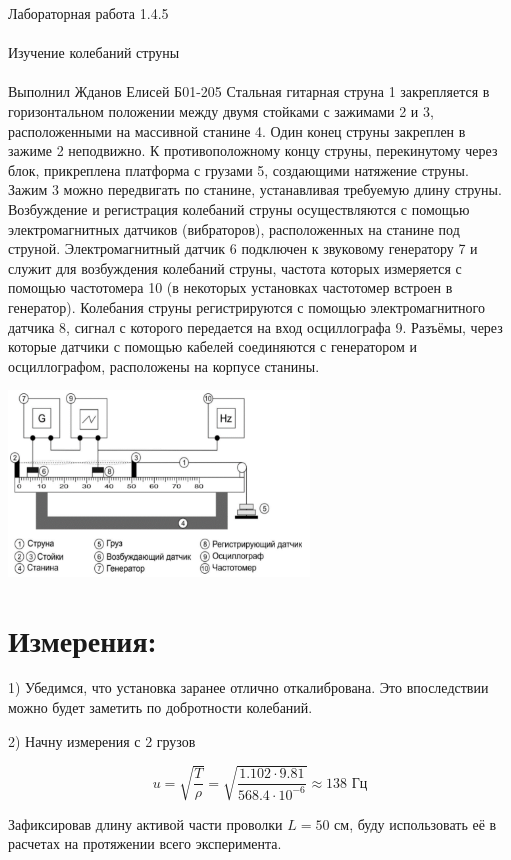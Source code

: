 \documentclass{astroedu-lab}
\begin{document}
\begin{problem}{\huge Лабораторная работа 1.4.5\\\\Изучение колебаний струны\\\\Выполнил Жданов Елисей Б01-205}
Стальная гитарная струна 1 закрепляется в горизонтальном положении между двумя стойками с зажимами 2 и 3, расположенными на массивной станине 4. Один конец струны закреплен в зажиме 2 неподвижно. К противоположному концу струны, перекинутому через блок, прикреплена платформа с грузами 5, создающими натяжение струны. Зажим 3 можно передвигать по станине, устанавливая требуемую длину струны. Возбуждение и регистрация колебаний струны осуществляются с помощью электромагнитных датчиков (вибраторов), расположенных на станине под струной. Электромагнитный датчик 6 подключен к звуковому генератору 7 и служит для возбуждения колебаний струны, частота которых измеряется с помощью частотомера 10 (в некоторых установках частотомер встроен в генератор). Колебания струны регистрируются с помощью электромагнитного датчика 8, сигнал с которого
передается на вход осциллографа 9. Разъёмы, через которые датчики с помощью кабелей соединяются с генератором и осциллографом, расположены на корпусе станины. 

\begin{center}
\includegraphics[width=0.6\textwidth]{state.png}
\label{ris:image}
\end{center}


\section{Измерения:}

1) Убедимся, что установка заранее отлично откалибрована. Это впоследствии можно будет заметить по добротности колебаний.

2) Начну измерения с 2 грузов

\begin{equation}
	u = \sqrt{\frac{T}{\rho}} = \sqrt{\frac{1.102 \cdot 9.81}{568.4 \cdot 10^{-6}}} \approx 138 \text{ Гц}
\end{equation}

Зафиксировав длину активой части проволки $L = 50$ см, буду использовать её в расчетах на протяжении всего эксперимента.


\end{problem}
\end{document}
